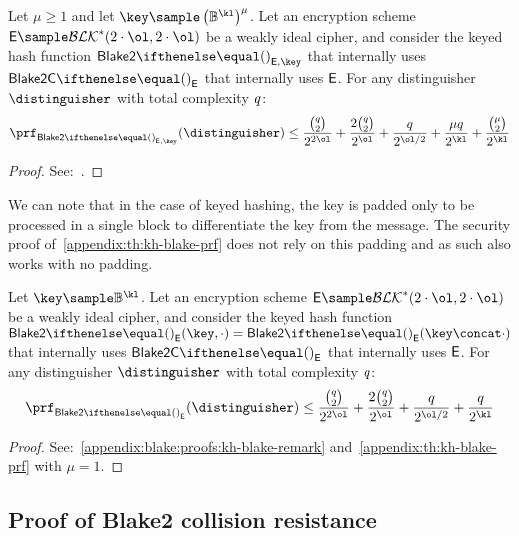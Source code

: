 \begin{theorem}\label{appendix:th:kh-blake-prf}
Let $\mu \geq 1$ and let $\key \sample \left( \BB^\kl \right )^\mu$. Let an encryption scheme $\Enc \sample \blockSet^*(2 \cdot \ol, 2 \cdot \ol)$ be a weakly ideal cipher, and consider the keyed hash function $\blake{2}{}_{\Enc, \key}$ that internally uses $\blake{2C}{}_\Enc$ that internally uses $\mathsf{E}$. For any distinguisher $\distinguisher$ with total complexity $\mathit{q}$:
    \[
        \prf_{\blake{2}{}_{\Enc, \key}}(\distinguisher) \leq \frac{\binom q 2}{2^{2\ol}} + \frac{2 \binom q 2}{2^{\ol}} + \frac{q}{2^{\ol/2}} + \frac{\mu q}{2^\kl} + \frac{\binom \mu 2}{2^\kl}
    \]
\end{theorem}
\begin{proof}
    See:~\cite[Corollary 3]{luykx2016security}.
\end{proof}

\begin{remark}\label{appendix:blake:proofs:kh-blake-remark}
We can note that in the case of keyed hashing, the key is padded only to be processed in a single block to differentiate the key from the message. The security proof of~\cref{appendix:th:kh-blake-prf} does not rely on this padding and as such also works with no padding.
\end{remark}

\begin{theorem}\label{appendix:th:blake-prf}
Let $\key \sample \BB^\kl$. Let an encryption scheme $\Enc \sample \blockSet^*(2 \cdot \ol, 2 \cdot \ol)$ be a weakly ideal cipher, and consider the keyed hash function $\blake{2}{}_{\Enc}(\key, \cdot) = \blake{2}{}_\Enc(\key \concat \cdot)$ that internally uses $\blake{2C}{}_\Enc$ that internally uses $\mathsf{E}$. For any distinguisher $\distinguisher$ with total complexity $\mathit{q}$:
    \[
        \prf_{\blake{2}{}_{\Enc}}(\distinguisher) \leq \frac{\binom q 2}{2^{2\ol}} + \frac{2 \binom q 2}{2^{\ol}} + \frac{q}{2^{\ol/2}} + \frac{q}{2^\kl}
    \]
\end{theorem}
\begin{proof}
    See:~\cref{appendix:blake:proofs:kh-blake-remark} and~\cref{appendix:th:kh-blake-prf} with $\mu=1$.
\end{proof}


\subsection{Proof of Blake2 collision resistance}\label{appendix:blake:proofs:colres}

